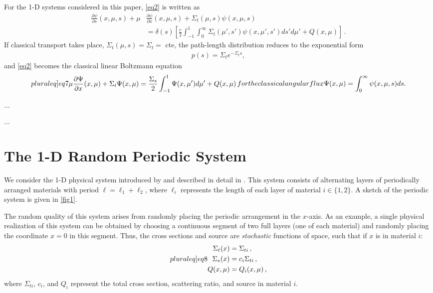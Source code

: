 \documentclass[12pt]{article}
\begin{document}
For the 1-D systems considered in this paper, \cref{eq2} is written as
\begin{align}\label{eq5}
\frac{\partial\psi}{\partial s}(x,\mu,s) + \mu&\frac{\partial \psi}{\partial x}(x,\mu,s) + \Sigma_t(\mu,s)\psi(x,\mu,s) 
\\& = \delta(s)\left[ \frac{c}{2}\int_{-1}^1\int_0^\infty \Sigma_t(\mu',s')\psi(x,\mu',s')ds' d\mu' + Q(x,\mu)\right]\,. \nonumber
\end{align}
If classical transport takes place, $\Sigma_t(\mu,s) = \Sigma_t =$ cte, the path-length distribution reduces to the exponential form
\begin{align}\label{eq6}
	p(s) = \Sigma_t e^{-\Sigma_t s},
\end{align}
and \cref{eq2} becomes the classical linear Boltzmann equation
\begin{subequations}\label[pluraleq]{eq7}
\begin{align}\label{eq7a}
\mu\frac{\partial\Psi}{\partial x}(x,\mu) + \Sigma_t\Psi(x,\mu) = \frac{\Sigma_s}{2}\int_{-1}^1\Psi(x,\mu')d\mu' +  Q(x,\mu) \,
\end{align}
for the classical angular flux 
\begin{align}
\Psi(x,\mu) = \int_0^\infty \psi(x,\mu,s)ds.
\end{align} 
\end{subequations}

...

...

\section{The 1-D Random Periodic System}\label{sec3}

We consider the 1-D physical system introduced by \cite{zuc94} and described in detail in \cite{nse16}.
This system consists of alternating layers of periodically arranged materials with period $\ell = \ell_1 + \ell_2$, where $\ell_i$ represents the length of each layer of material $i \in \{1,2\}$.
A sketch of the periodic system is given in \cref{fig1}.

The random quality of this system arises from randomly placing the periodic arrangement in the $x$-axis.
As an example, a single physical realization of this system can be obtained by choosing a continuous segment of two full layers (one of each material) and randomly placing the coordinate $x=0$ in this segment.
Thus, the cross sections and source are {\em stochastic} functions of space, such that if $x$ is in material $i$:
\begin{subequations}\label[pluraleq]{eq8}
\begin{align}
\Sigma_t(x) &= \Sigma_{ti}\, ,\\
\Sigma_s(x) &= c_i \Sigma_{ti}\, ,\\
Q(x,\mu) &= Q_i(x,\mu) \, ,
\end{align}
\end{subequations}
where $\Sigma_{ti}$, $c_i$, and $Q_i$ represent the total cross section, scattering ratio, and source in material $i$. 
\end{document}
